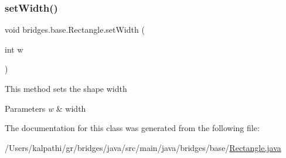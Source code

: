 \mbox{\label{classbridges_1_1base_1_1_rectangle_a803ca26bb6bb0c29c9316d910fce0fe1}} 
\subsubsection{\texorpdfstring{setWidth()}{setWidth()}}
{\footnotesize\ttfamily void bridges.\+base.\+Rectangle.\+set\+Width (\begin{DoxyParamCaption}\item[{int}]{w }\end{DoxyParamCaption})}

This method sets the shape width


\begin{DoxyParams}{Parameters}
{\em w} & width \\
\hline
\end{DoxyParams}


The documentation for this class was generated from the following file\+:\begin{DoxyCompactItemize}
\item 
/\+Users/kalpathi/gr/bridges/java/src/main/java/bridges/base/\mbox{\hyperlink{_rectangle_8java}{Rectangle.\+java}}\end{DoxyCompactItemize}
